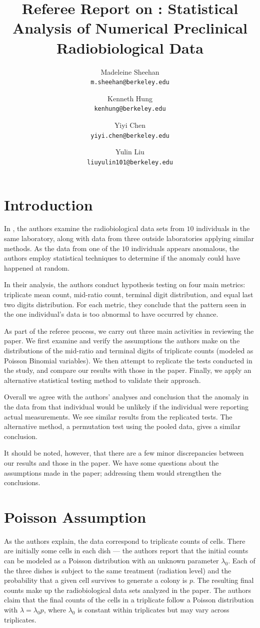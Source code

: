 \documentclass[11pt]{article}
\title{Referee Report on \citet{Pitt:2016cu}: Statistical Analysis of Numerical Preclinical Radiobiological Data}
\author{Madeleine Sheehan \\ {\tt m.sheehan@berkeley.edu}
\and Kenneth Hung \\ {\tt kenhung@berkeley.edu}
\and Yiyi Chen \\ {\tt yiyi.chen@berkeley.edu}
\and Yulin Liu \\ {\tt liuyulin101@berkeley.edu}}
\begin{document}
\maketitle

\section{Introduction}
In \citet{Pitt:2016cu}, the authors examine the radiobiological data sets from $10$ individuals in the same laboratory, along with data from three outside laboratories applying similar methods. As the data from one of the $10$ individuals appears anomalous, the authors employ statistical techniques to determine if the anomaly could have happened at random.

In their analysis, the authors conduct hypothesis testing on four main metrics: triplicate mean count, mid-ratio count, terminal digit distribution, and equal last two digits distribution. For each metric, they conclude that the pattern seen in the one individual’s data is too abnormal to have occurred by chance.

As part of the referee process, we carry out three main activities in reviewing the paper. We first examine and verify the assumptions the authors make on the distributions of the mid-ratio and terminal digits of triplicate counts (modeled as Poisson Binomial variables). We then attempt to replicate the tests conducted in the study, and compare our results with those in the paper. Finally, we apply an alternative statistical testing method to validate their approach.

Overall we agree with the authors' analyses and conclusion that the anomaly in the data from that individual would be unlikely if the individual were reporting actual measurements. We see similar results from the replicated tests. The alternative method, a permutation test using the pooled data, gives a similar conclusion.

It should be noted, however, that there are a few minor discrepancies between our results and those in the paper. We have some questions about the assumptions made in the paper; addressing them would strengthen the conclusions.

\section{Poisson Assumption}

As the authors explain, the data correspond to triplicate counts of cells. There are initially some cells in each dish --- the authors report that the initial counts can be modeled as a Poisson distribution with an unknown parameter $\lambda_0$. Each of the three dishes is subject to the same treatment (radiation level) and the probability that a given cell survives to generate a colony is $p$. The resulting final counts make up the radiobiological data sets analyzed in the paper. The authors claim that the final counts of the cells in a triplicate follow a Poisson distribution with $\lambda = \lambda_0 p$, where $\lambda_0$ is constant within triplicates but may vary across triplicates.
\end{document}
